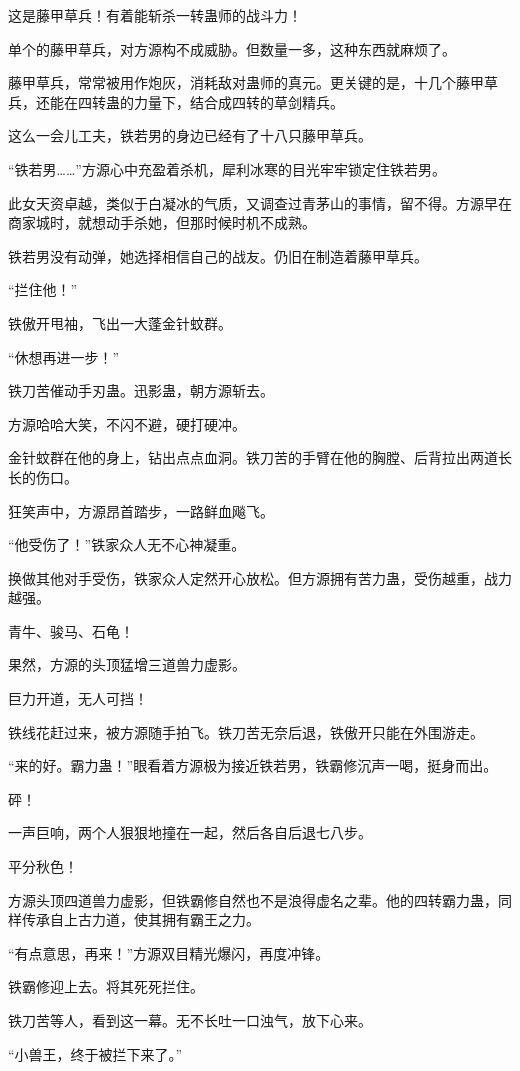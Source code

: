 \begin{this_body}
这是藤甲草兵！有着能斩杀一转蛊师的战斗力！

单个的藤甲草兵，对方源构不成威胁。但数量一多，这种东西就麻烦了。

藤甲草兵，常常被用作炮灰，消耗敌对蛊师的真元。更关键的是，十几个藤甲草兵，还能在四转蛊的力量下，结合成四转的草剑精兵。

这么一会儿工夫，铁若男的身边已经有了十八只藤甲草兵。

“铁若男……”方源心中充盈着杀机，犀利冰寒的目光牢牢锁定住铁若男。

此女天资卓越，类似于白凝冰的气质，又调查过青茅山的事情，留不得。方源早在商家城时，就想动手杀她，但那时候时机不成熟。

铁若男没有动弹，她选择相信自己的战友。仍旧在制造着藤甲草兵。

“拦住他！”

铁傲开甩袖，飞出一大蓬金针蚊群。

“休想再进一步！”

铁刀苦催动手刃蛊。迅影蛊，朝方源斩去。

方源哈哈大笑，不闪不避，硬打硬冲。

金针蚊群在他的身上，钻出点点血洞。铁刀苦的手臂在他的胸膛、后背拉出两道长长的伤口。

狂笑声中，方源昂首踏步，一路鲜血飚飞。

“他受伤了！”铁家众人无不心神凝重。

换做其他对手受伤，铁家众人定然开心放松。但方源拥有苦力蛊，受伤越重，战力越强。

青牛、骏马、石龟！

果然，方源的头顶猛增三道兽力虚影。

巨力开道，无人可挡！

铁线花赶过来，被方源随手拍飞。铁刀苦无奈后退，铁傲开只能在外围游走。

“来的好。霸力蛊！”眼看着方源极为接近铁若男，铁霸修沉声一喝，挺身而出。

砰！

一声巨响，两个人狠狠地撞在一起，然后各自后退七八步。

平分秋色！

方源头顶四道兽力虚影，但铁霸修自然也不是浪得虚名之辈。他的四转霸力蛊，同样传承自上古力道，使其拥有霸王之力。

“有点意思，再来！”方源双目精光爆闪，再度冲锋。

铁霸修迎上去。将其死死拦住。

铁刀苦等人，看到这一幕。无不长吐一口浊气，放下心来。

“小兽王，终于被拦下来了。”


\end{this_body}

